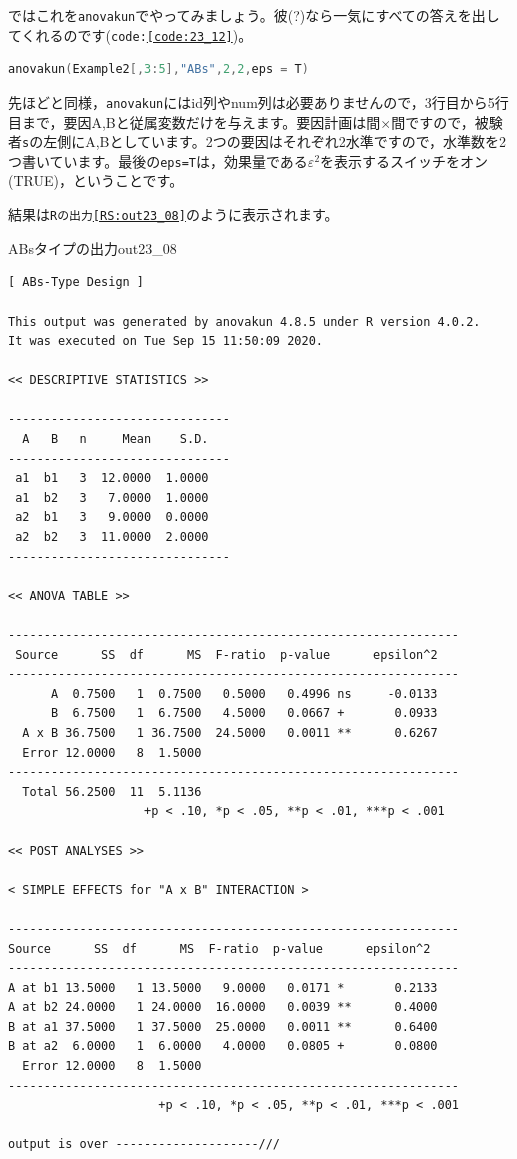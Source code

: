 \documentclass{ltjbook}
\begin{document}
ではこれを\texttt{anovakun}でやってみましょう。彼(?)なら一気にすべての答えを出してくれるのです(\texttt{code:\ref{code:23_12}})。
\begin{lstlisting}[language=c++,label={code:23_12},caption={anovakunで実行}]
anovakun(Example2[,3:5],"ABs",2,2,eps = T)
\end{lstlisting}
先ほどと同様，\texttt{anovakun}にはid列やnum列は必要ありませんので，3行目から5行目まで，要因A,Bと従属変数だけを与えます。要因計画は間$\times$間ですので，被験者\texttt{s}の左側にA,Bとしています。2つの要因はそれぞれ2水準ですので，水準数を2つ書いています。最後の\texttt{eps=T}は，効果量である$\varepsilon^2$を表示するスイッチをオン(TRUE)，ということです。

結果は\texttt{Rの出力\ref{RS:out23_08}}のように表示されます。
\begin{Rscreen}{ABsタイプの出力}{out23_08}
	\begin{verbatim}
[ ABs-Type Design ]

This output was generated by anovakun 4.8.5 under R version 4.0.2.
It was executed on Tue Sep 15 11:50:09 2020.

<< DESCRIPTIVE STATISTICS >>

-------------------------------
  A   B   n     Mean    S.D. 
-------------------------------
 a1  b1   3  12.0000  1.0000 
 a1  b2   3   7.0000  1.0000 
 a2  b1   3   9.0000  0.0000 
 a2  b2   3  11.0000  2.0000 
-------------------------------

<< ANOVA TABLE >>

---------------------------------------------------------------
 Source      SS  df      MS  F-ratio  p-value      epsilon^2 
---------------------------------------------------------------
      A  0.7500   1  0.7500   0.5000   0.4996 ns     -0.0133 
      B  6.7500   1  6.7500   4.5000   0.0667 +       0.0933 
  A x B 36.7500   1 36.7500  24.5000   0.0011 **      0.6267 
  Error 12.0000   8  1.5000                                  
---------------------------------------------------------------
  Total 56.2500  11  5.1136                                  
                   +p < .10, *p < .05, **p < .01, ***p < .001

<< POST ANALYSES >>

< SIMPLE EFFECTS for "A x B" INTERACTION >

---------------------------------------------------------------
Source      SS  df      MS  F-ratio  p-value      epsilon^2 
---------------------------------------------------------------
A at b1 13.5000   1 13.5000   9.0000   0.0171 *       0.2133 
A at b2 24.0000   1 24.0000  16.0000   0.0039 **      0.4000 
B at a1 37.5000   1 37.5000  25.0000   0.0011 **      0.6400 
B at a2  6.0000   1  6.0000   4.0000   0.0805 +       0.0800 
  Error 12.0000   8  1.5000                                  
---------------------------------------------------------------
                     +p < .10, *p < .05, **p < .01, ***p < .001

output is over --------------------///
\end{verbatim}
\end{Rscreen}
\end{document}
